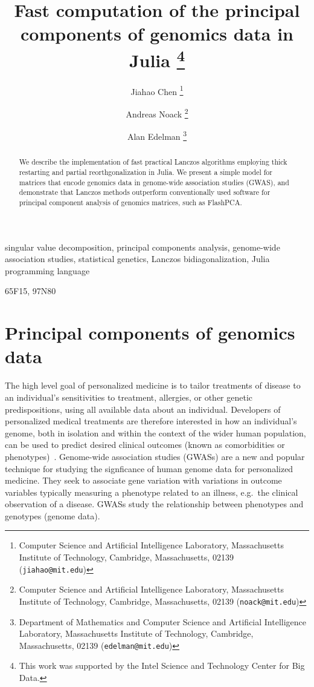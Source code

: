 \documentclass[review]{siamart0516}
\title{Fast computation of the principal components of genomics data in Julia
    \thanks{This
        work was supported by the Intel Science and Technology Center for Big Data.
	}}
\author{%
    Jiahao Chen
    \thanks{Computer Science and Artificial Intelligence Laboratory,
           Massachusetts Institute of Technology,
           Cambridge, Massachusetts, 02139 ({\tt jiahao@mit.edu})}
    \and
    Andreas Noack
    \thanks{Computer Science and Artificial Intelligence Laboratory,
            Massachusetts Institute of Technology,
            Cambridge, Massachusetts, 02139 ({\tt noack@mit.edu})}
    \and
    Alan Edelman
    \thanks{Department of Mathematics and Computer Science and Artificial Intelligence Laboratory,
            Massachusetts Institute of Technology,
            Cambridge, Massachusetts, 02139 ({\tt edelman@mit.edu})}
}
\begin{document}
\maketitle

\tableofcontents

\begin{abstract}
We describe the implementation of fast practical Lanczos algorithms employing
thick restarting and partial reorthgonalization in Julia. We present a simple
model for matrices that encode genomics data in genome-wide association studies
(GWAS), and demonstrate that Lanczos methods outperform conventionally used
software for principal component analysis of genomics matrices, such as FlashPCA.
\end{abstract}

\begin{keywords}
    singular value decomposition,
    principal components analysis,
    genome-wide association studies,
    statistical genetics,
    Lanczos bidiagonalization,
    Julia programming language
\end{keywords}

\begin{AMS}
    65F15, 97N80
\end{AMS}

\pagestyle{myheadings}
\thispagestyle{plain}

\section{Principal components of genomics data}

The high level goal of personalized medicine is to tailor treatments of disease
to an individual's sensitivities to treatment, allergies, or other genetic
predispositions, using all available data about an individual.
Developers of personalized medical treatments are therefore interested in how an
individual's genome, both in isolation and within the context of the wider human
population, can be used to predict desired clinical outcomes (known as
comorbidities or phenotypes)~\cite[Ch. 8]{Laird2011}.
Genome-wide association studies (GWASs) are a new and popular technique for
studying the signficance of human genome data for personalized medicine.
They seek to associate gene variation with variations in outcome variables
typically measuring a phenotype related to an illness, e.g.\ the clinical
observation of a disease. GWASs study the relationship between phenotypes and
genotypes (genome data).
\end{document}
